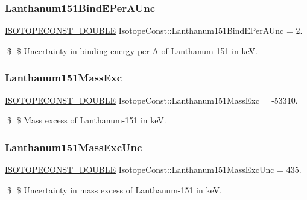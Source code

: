 \subsubsection{\texorpdfstring{Lanthanum151\+Bind\+E\+Per\+A\+Unc}{Lanthanum151BindEPerAUnc}}
{\footnotesize\ttfamily \mbox{\hyperlink{group___isotope_const-_macros_ga8f45a7272ce02c0b4c65c44636ed719a}{I\+S\+O\+T\+O\+P\+E\+C\+O\+N\+S\+T\+\_\+\+D\+O\+U\+B\+LE}} Isotope\+Const\+::\+Lanthanum151\+Bind\+E\+Per\+A\+Unc = 2.}

\$ \$ Uncertainty in binding energy per A of Lanthanum-\/151 in keV. \mbox{\label{group___isotope_const-_lanthanum-_la151_gaf03a83a4829aba29b71ba195ec607f3c}} 
\subsubsection{\texorpdfstring{Lanthanum151\+Mass\+Exc}{Lanthanum151MassExc}}
{\footnotesize\ttfamily \mbox{\hyperlink{group___isotope_const-_macros_ga8f45a7272ce02c0b4c65c44636ed719a}{I\+S\+O\+T\+O\+P\+E\+C\+O\+N\+S\+T\+\_\+\+D\+O\+U\+B\+LE}} Isotope\+Const\+::\+Lanthanum151\+Mass\+Exc = -\/53310.}

\$ \$ Mass excess of Lanthanum-\/151 in keV. \mbox{\label{group___isotope_const-_lanthanum-_la151_ga113faa9eba0d4ab9aae65bd8b0cc8996}} 
\subsubsection{\texorpdfstring{Lanthanum151\+Mass\+Exc\+Unc}{Lanthanum151MassExcUnc}}
{\footnotesize\ttfamily \mbox{\hyperlink{group___isotope_const-_macros_ga8f45a7272ce02c0b4c65c44636ed719a}{I\+S\+O\+T\+O\+P\+E\+C\+O\+N\+S\+T\+\_\+\+D\+O\+U\+B\+LE}} Isotope\+Const\+::\+Lanthanum151\+Mass\+Exc\+Unc = 435.}

\$ \$ Uncertainty in mass excess of Lanthanum-\/151 in keV. \mbox{\label{group___isotope_const-_lanthanum-_la151_ga526f610c43291917e8991b9875b5932c}} 

